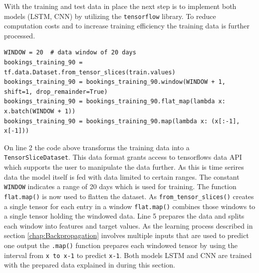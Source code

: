 With the training and test data in place the next step is to implement both models (LSTM, CNN) by utilizing the \verb|tensorflow| library. To reduce computation costs and to increase training efficiency the training data is further processed.
\begin{lstlisting}
WINDOW = 20  # data window of 20 days
bookings_training_90 = tf.data.Dataset.from_tensor_slices(train.values)
bookings_training_90 = bookings_training_90.window(WINDOW + 1, shift=1, drop_remainder=True)
bookings_training_90 = bookings_training_90.flat_map(lambda x: x.batch(WINDOW + 1))
bookings_training_90 = bookings_training_90.map(lambda x: (x[:-1], x[-1]))
\end{lstlisting}
On line 2 the code above transforms the training data into a \verb|TensorSliceDataset|. This data format grants access to tensorflows data API which supports the user to manipulate the data further. As this is time serires data the model itself is fed with data limited to certain ranges. The constant \verb|WINDOW| indicates a range of 20 days which is used for training. The function \verb|flat.map()| is now used to flatten the dataset. As \verb|from_tensor_slices()| creates a single tensor for each entry in a window \verb|flat.map()| combines those windows to a single tensor holding the windowed data. Line 5 prepares the data and splits each window into features and target values. As the learning process described in section \ref{chap:Backpropagation} involves multiple inputs that are used to predict one output the \verb|.map()| function prepares each windowed tensor by using the interval from \verb|x to x-1| to predict \verb|x-1|.
Both models LSTM and CNN are trained with the prepared data explained in during this section. 

